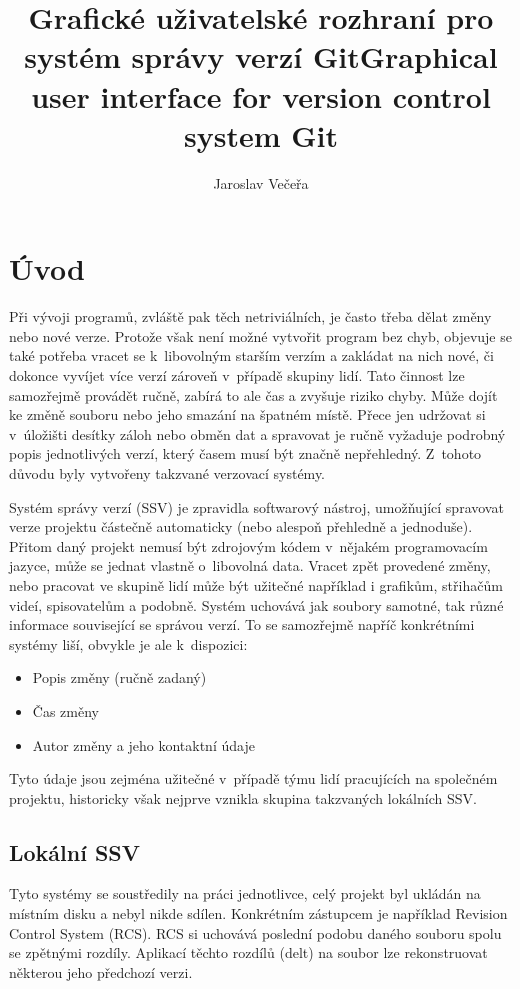 \documentclass[
  biblatex,
  glossaries,
  index
]{kidiplom}
\title{Grafické uživatelské rozhraní pro systém správy verzí Git}
\title[english]{Graphical user interface for version control system Git}
\author{Jaroslav Večeřa}
\begin{document}
\maketitle



\newcommand{\BibLaTeX}{\textsc{Bib}\LaTeX}

\section{Úvod}
Při vývoji programů, zvláště pak těch netriviálních, je často třeba
dělat změny nebo nové verze. Protože však není možné vytvořit program
bez chyb, objevuje se také potřeba vracet se k~libovolným starším
verzím a zakládat na nich nové, či dokonce vyvíjet více verzí zároveň
v~případě skupiny lidí. Tato činnost lze samozřejmě provádět ručně,
zabírá to ale čas a zvyšuje riziko chyby. Může dojít ke změně souboru
nebo jeho smazání na špatném místě. Přece jen udržovat si v~úložišti
desítky záloh nebo obměn dat a spravovat je ručně vyžaduje podrobný
popis jednotlivých verzí, který časem musí být značně nepřehledný.
Z~tohoto důvodu byly vytvořeny takzvané verzovací systémy.

Systém správy verzí (SSV) je zpravidla softwarový nástroj,
umožňující spravovat verze projektu částečně automaticky (nebo alespoň
přehledně a jednoduše). Přitom daný projekt nemusí být zdrojovým kódem
v~nějakém programovacím jazyce, může se jednat vlastně o~libovolná data.
Vracet zpět provedené změny, nebo pracovat ve skupině lidí může být
užitečné například i grafikům, střihačům videí, spisovatelům a podobně.
Systém uchovává jak soubory samotné, tak různé informace související
se správou verzí. To se samozřejmě napříč konkrétními systémy liší,
obvykle je ale k~dispozici:
\begin{itemize}
\item Popis změny (ručně zadaný)
\item Čas změny
\item Autor změny a jeho kontaktní údaje
\end{itemize}

Tyto údaje jsou zejména užitečné v~případě týmu lidí pracujících na
společném projektu, historicky však nejprve vznikla skupina takzvaných
lokálních SSV.

\subsection{Lokální SSV}
Tyto systémy se soustředily na práci jednotlivce, celý projekt byl 
ukládán na místním disku a nebyl nikde sdílen. Konkrétním zástupcem je 
například Revision Control System (RCS). RCS si uchovává poslední podobu  
daného souboru spolu se zpětnými rozdíly. Aplikací těchto rozdílů (delt) 
na soubor lze rekonstruovat některou jeho předchozí verzi.
\end{document}

